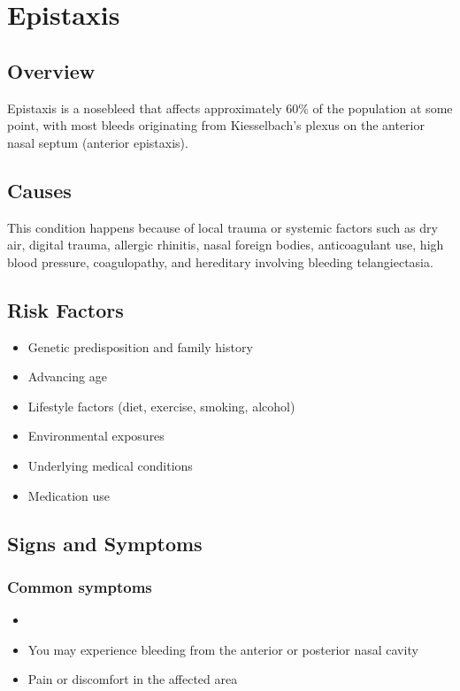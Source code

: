 \chapter{Epistaxis}
\label{sec:Epistaxis}

\section{Overview}
Epistaxis is a nosebleed that affects approximately 60\% of the population at some point, with most bleeds originating from Kiesselbach's plexus on the anterior nasal septum (anterior epistaxis).
\section{Causes}
This condition happens because of local trauma or systemic factors such as dry air, digital trauma, allergic rhinitis, nasal foreign bodies, anticoagulant use, high blood pressure, coagulopathy, and hereditary involving bleeding telangiectasia.     
\section{Risk Factors}

\begin{itemize}[noitemsep]
  \item Genetic predisposition and family history
  \item Advancing age
  \item Lifestyle factors (diet, exercise, smoking, alcohol)
  \item Environmental exposures
  \item Underlying medical conditions
  \item Medication use
\end{itemize}
\section{Signs and Symptoms}

\subsection{Common symptoms}
\begin{itemize}[noitemsep]
  \item \item You may experience bleeding from the anterior or posterior nasal cavity

  \item Pain or discomfort in the affected area
  \end{itemize}

